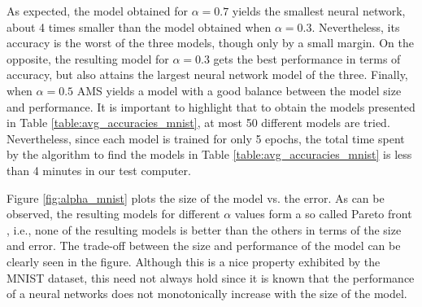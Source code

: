 \documentclass[preprint,12pt]{elsarticle}%
\begin{document}
As expected, the model obtained for $\alpha = 0.7$ yields the smallest neural network, about 4 times smaller than the model obtained when $\alpha = 0.3$. Nevertheless, its accuracy is the worst of the three models, though only by a small margin. On the opposite, the resulting model for $\alpha = 0.3$ gets the best performance in terms of accuracy, but also attains the largest neural network model of the three. Finally, when $\alpha = 0.5$ AMS yields a model with a good balance between the model size and performance. It is important to highlight that to obtain the models presented in Table \ref{table:avg_accuracies_mnist}, at most 50 different models are tried. Nevertheless, since each model is trained for only 5 epochs, the total time spent by the algorithm to find the models in Table \ref{table:avg_accuracies_mnist} is less than 4 minutes in our test computer. 

Figure \ref{fig:alpha_mnist} plots the size of the model vs. the error. As can be observed, the resulting models for different $\alpha$ values form a so called Pareto front \cite{Nocedal06}, i.e., none of the resulting models is better than the others in terms of the size and error. The trade-off between the size and performance of the model can be clearly seen in the figure. Although this is a nice property exhibited by the MNIST dataset, this need not always hold since it is known that the performance of a neural networks does not monotonically increase with the size of the model. 
\end{document}

